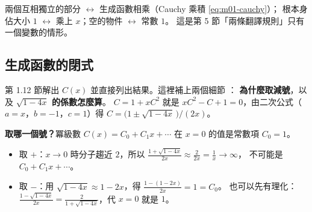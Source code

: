 \begin{keybox}[獨立 $\to$ 相乘]
兩個互相獨立的部分 $\longleftrightarrow$ 生成函數相乘（Cauchy 乘積 \eqref{eq:m01-cauchy}）；
根本身佔大小 $1$ $\longleftrightarrow$ 乘上 $x$；空的物件 $\longleftrightarrow$ 常數 $1$。
這是第 5 節「兩條翻譯規則」只有一個變數的情形。
\end{keybox}

\subsection{生成函數的閉式}\label{sec:m02}

第 1.12 節解出 $C(x)$ 並直接列出結果。這裡補上兩個細節 ：
\textbf{為什麼取減號}，以及 \textbf{$\sqrt{1-4x}$ 的係數怎麼算}。
$C=1+xC^2$ 就是 $xC^2-C+1=0$，由二次公式（$a=x$，$b=-1$，$c=1$）得 $C=\bigl(1\pm\sqrt{1-4x}\,\bigr)/(2x)$。

\noindent
\begin{minipage}[c]{0.56\textwidth}
\textbf{取哪一個號？}冪級數 $C(x)=C_0+C_1x+\cdots$ 在 $x=0$ 的值是常數項 $C_0=1$。
\begin{itemize}[leftmargin=1.2em]
  \item 取 $+$：$x\to0$ 時分子趨近 $2$，所以
        $\frac{1+\sqrt{1-4x}}{2x}\approx\frac{2}{2x}=\frac1x\to\infty$，
        不可能是 $C_0+C_1x+\cdots$。
  \item 取 $-$：用 $\sqrt{1-4x}\approx1-2x$，得 $\frac{1-(1-2x)}{2x}=1=C_0$。
        也可以先有理化：$\frac{1-\sqrt{1-4x}}{2x}=\frac{2}{1+\sqrt{1-4x}}$，代 $x=0$ 就是 $1$。
\end{itemize}
\end{minipage}\hfill
\begin{minipage}[c]{0.4\textwidth}
\centering
\FigMiiBranches
{}
\label{fig:m02-branches}
\end{minipage}

